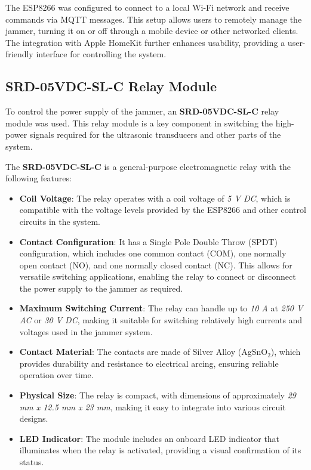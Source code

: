 The ESP8266 was configured to connect to a local Wi-Fi network and receive commands via MQTT messages. This setup allows users to remotely manage the jammer, turning it on or off through a mobile device or other networked clients. The integration with Apple HomeKit further enhances usability, providing a user-friendly interface for controlling the system.

\subsection{SRD-05VDC-SL-C Relay Module}

To control the power supply of the jammer, an \textbf{SRD-05VDC-SL-C} \cite{SRD-05VDC-SL-C Relay} relay module was used. This relay module is a key component in switching the high-power signals required for the ultrasonic transducers and other parts of the system.

The \textbf{SRD-05VDC-SL-C} is a general-purpose electromagnetic relay with the following features:

\begin{itemize}
    \item \textbf{Coil Voltage}: The relay operates with a coil voltage of \textit{5 V DC}, which is compatible with the voltage levels provided by the ESP8266 and other control circuits in the system.
    
    \item \textbf{Contact Configuration}: It has a Single Pole Double Throw (SPDT) configuration, which includes one common contact (COM), one normally open contact (NO), and one normally closed contact (NC). This allows for versatile switching applications, enabling the relay to connect or disconnect the power supply to the jammer as required.
    
    \item \textbf{Maximum Switching Current}: The relay can handle up to \textit{10 A} at \textit{250 V AC} or \textit{30 V DC}, making it suitable for switching relatively high currents and voltages used in the jammer system.
    
    \item \textbf{Contact Material}: The contacts are made of Silver Alloy (AgSnO\(_2\)), which provides durability and resistance to electrical arcing, ensuring reliable operation over time.
    
    \item \textbf{Physical Size}: The relay is compact, with dimensions of approximately \textit{29 mm x 12.5 mm x 23 mm}, making it easy to integrate into various circuit designs.
    
    \item \textbf{LED Indicator}: The module includes an onboard LED indicator that illuminates when the relay is activated, providing a visual confirmation of its status.
\end{itemize}

